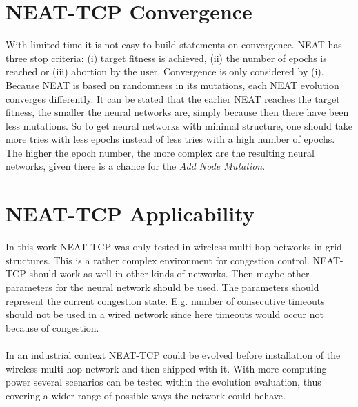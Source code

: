 \section{NEAT-TCP Convergence}\label{sec:neatConvergence}
With limited time it is not easy to build statements on convergence. NEAT has three stop criteria: (i) target fitness is achieved, (ii) the number of epochs is reached or (iii) abortion by the user. Convergence is only considered by (i). Because NEAT is based on randomness in its mutations, each NEAT evolution converges differently. It can be stated that the earlier NEAT reaches the target fitness, the smaller the neural networks are, simply because then there have been less mutations. So to get neural networks with minimal structure, one should take more tries with less epochs instead of less tries with a high number of epochs. The higher the epoch number, the more complex are the resulting neural networks, given there is a chance for the \textit{Add Node Mutation}.

\section{NEAT-TCP Applicability}\label{sec:neatApplicability}
In this work NEAT-TCP was only tested in wireless multi-hop networks in grid structures. This is a rather complex environment for congestion control. NEAT-TCP should work as well in other kinds of networks. Then maybe other parameters for the neural network should be used. The parameters should represent the current congestion state. E.g. number of consecutive timeouts should not be used in a wired network since here timeouts would occur not because of congestion.\\\\
In an industrial context NEAT-TCP could be evolved before installation of the wireless multi-hop network and then shipped with it. With more computing power several scenarios can be tested within the evolution evaluation, thus covering a wider range of possible ways the network could behave.

